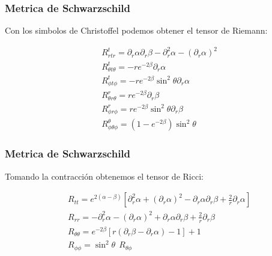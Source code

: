 \documentclass{beamer}
\begin{document}


\begin{frame}
\frametitle{Metrica de Schwarzschild}

Con los simbolos de Christoffel podemos obtener el tensor de Riemann: 

\begin{align*}
  &R_{r t r}^{t}=\partial_r \alpha \partial_r \beta-\partial_r^2 \alpha-(\partial_r \alpha)^2 \\
  &R_{\theta t \theta }^{t}=-r e^{-2 \beta} \partial_r \alpha \\
  &R_{\phi t \phi}^t=-r e^{-2 \beta} \sin ^2 \theta \partial_r \alpha \\
  &R_{\theta r \theta}^r=r e^{-2 \beta} \partial_r \beta \\
  &R_{\phi r \phi}^{r}=r e^{-2 \beta} \sin ^2 \theta \partial_r \beta \\
  &R _{\phi \theta \phi } ^ {\theta }=\left(1-e^{-2 \beta}\right) \sin ^2 \theta 
\end{align*}


\end{frame}




\begin{frame}
\frametitle{Metrica de Schwarzschild}

Tomando la contracción obtenemos el tensor de Ricci: 

\begin{align*}
  &R_{t t}=e^{2(\alpha-\beta)}\left[\partial_r^2 \alpha+\left(\partial_r \alpha\right)^2-\partial_r \alpha \partial_r \beta+\frac{2}{r} \partial_r \alpha\right] \\
  &R_{r r}=-\partial_r^2 \alpha-\left(\partial_r \alpha\right)^2+\partial_r \alpha \partial_r \beta+\frac{2}{r} \partial_r \beta \\
  &R_{\theta \theta}=e^{-2 \beta}\left[r\left(\partial_r \beta-\partial_r \alpha\right)-1\right]+1 \\
  &R_{\phi \phi}=\sin ^2 \theta \ \ R_{\theta \phi}
\end{align*}


\end{frame}

\end{document}
